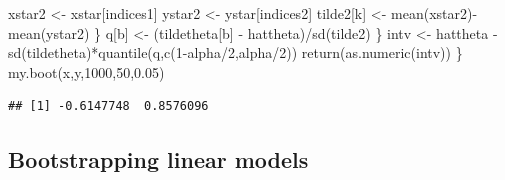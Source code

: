 \documentclass[
]{book}
\newenvironment{Shaded}{\begin{snugshade}}{\end{snugshade}}
\newcommand{\DecValTok}[1]{\textcolor[rgb]{0.00,0.00,0.81}{#1}}
\newcommand{\FloatTok}[1]{\textcolor[rgb]{0.00,0.00,0.81}{#1}}
\newcommand{\FunctionTok}[1]{\textcolor[rgb]{0.00,0.00,0.00}{#1}}
\newcommand{\NormalTok}[1]{#1}
\newcommand{\OtherTok}[1]{\textcolor[rgb]{0.56,0.35,0.01}{#1}}
\newcommand{\SpecialCharTok}[1]{\textcolor[rgb]{0.00,0.00,0.00}{#1}}
\begin{document}
\begin{Shaded}
\begin{Highlighting}[]
\NormalTok{        xstar2 }\OtherTok{\textless{}{-}}\NormalTok{ xstar[indices1]}
\NormalTok{        ystar2 }\OtherTok{\textless{}{-}}\NormalTok{ ystar[indices2]}
\NormalTok{        tilde2[k] }\OtherTok{\textless{}{-}} \FunctionTok{mean}\NormalTok{(xstar2)}\SpecialCharTok{{-}}\FunctionTok{mean}\NormalTok{(ystar2)}
\NormalTok{    \}}
\NormalTok{  q[b] }\OtherTok{\textless{}{-}}\NormalTok{ (tildetheta[b] }\SpecialCharTok{{-}}\NormalTok{ hattheta)}\SpecialCharTok{/}\FunctionTok{sd}\NormalTok{(tilde2)}
\NormalTok{  \}}
\NormalTok{  intv }\OtherTok{\textless{}{-}}\NormalTok{ hattheta }\SpecialCharTok{{-}} \FunctionTok{sd}\NormalTok{(tildetheta)}\SpecialCharTok{*}\FunctionTok{quantile}\NormalTok{(q,}\FunctionTok{c}\NormalTok{(}\DecValTok{1}\SpecialCharTok{{-}}\NormalTok{alpha}\SpecialCharTok{/}\DecValTok{2}\NormalTok{,alpha}\SpecialCharTok{/}\DecValTok{2}\NormalTok{))}
  \FunctionTok{return}\NormalTok{(}\FunctionTok{as.numeric}\NormalTok{(intv))}
\NormalTok{\}}
\FunctionTok{my.boot}\NormalTok{(x,y,}\DecValTok{1000}\NormalTok{,}\DecValTok{50}\NormalTok{,}\FloatTok{0.05}\NormalTok{)}
\end{Highlighting}
\end{Shaded}

\begin{verbatim}
## [1] -0.6147748  0.8576096
\end{verbatim}

\hypertarget{bootstrapping-linear-models}{%
\subsection{Bootstrapping linear models}\label{bootstrapping-linear-models}}
\end{document}
